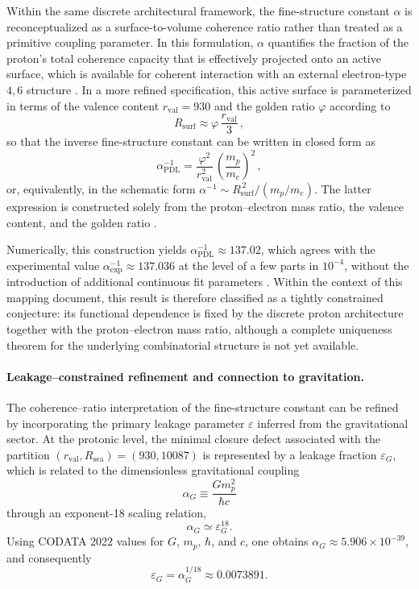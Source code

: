 \documentclass[11pt,a4paper]{article}
\begin{document}
Within the same discrete architectural framework, the fine-structure constant \(\alpha\) is reconceptualized as a surface-to-volume coherence ratio rather than treated as a primitive coupling parameter. In this formulation, \(\alpha\) quantifies the fraction of the proton’s total coherence capacity that is effectively projected onto an active surface, which is available for coherent interaction with an external electron-type \(4,6\) structure \citep{PDL_intro,PDL_Main_2026}. In a more refined specification, this active surface is parameterized in terms of the valence content
\(r_{\mathrm{val}} = 930\) and the golden ratio \(\varphi\) according to
\[
  R_{\mathrm{surf}} \approx \varphi \,\frac{r_{\mathrm{val}}}{3} \, ,
\]
so that the inverse fine-structure constant can be written in closed form as
\[
  \alpha^{-1}_{\mathrm{PDL}} = \frac{\varphi^{2}}{r_{\mathrm{val}}^{2}}\,\left(\frac{m_p}{m_e}\right)^{2} \, ,
\]
or, equivalently, in the schematic form \(\alpha^{-1} \sim R_{\mathrm{surf}}^{\,2}/(m_p/m_e)\). The latter expression is constructed solely from the proton–electron mass ratio, the valence content, and the golden ratio \citep{Alpha_PDL_v2_2026,Born_Golden_v2_2026}.

Numerically, this construction yields \(\alpha^{-1}_{\mathrm{PDL}} \approx 137.02\), which agrees with the experimental value \(\alpha^{-1}_{\mathrm{exp}} \approx 137.036\) at the level of a few parts in \(10^{-4}\), without the introduction of additional continuous fit parameters \citep{Alpha_PDL_v2_2026,PDL_intro}. Within the context of this mapping document, this result is therefore classified as a tightly constrained conjecture: its functional dependence is fixed by the discrete proton architecture together with the proton–electron mass ratio, although a complete uniqueness theorem for the underlying combinatorial structure is not yet available. 

\paragraph{Leakage–constrained refinement and connection to gravitation.}

The coherence–ratio interpretation of the fine-structure constant can be refined by incorporating the primary leakage parameter $\varepsilon$ inferred from the gravitational sector.\cite{Universal_Coherence_Leakage_V3_2026}
At the protonic level, the minimal closure defect associated with the partition $(r_{\text{val}},R_{\text{sea}})=(930,10087)$ is represented by a leakage fraction $\varepsilon_G$, which is related to the dimensionless gravitational coupling
\[
\alpha_G \equiv \frac{G m_p^2}{\hbar c}
\]
through an exponent-18 scaling relation,
\[
\alpha_G \simeq \varepsilon_G^{18}.
\]
Using CODATA 2022 values for $G$, $m_p$, $\hbar$, and $c$, one obtains
$\alpha_G \approx 5.906\times 10^{-39}$, and consequently
\[
\varepsilon_G = \alpha_G^{1/18} \approx 0.0073891.
\]
\end{document}
